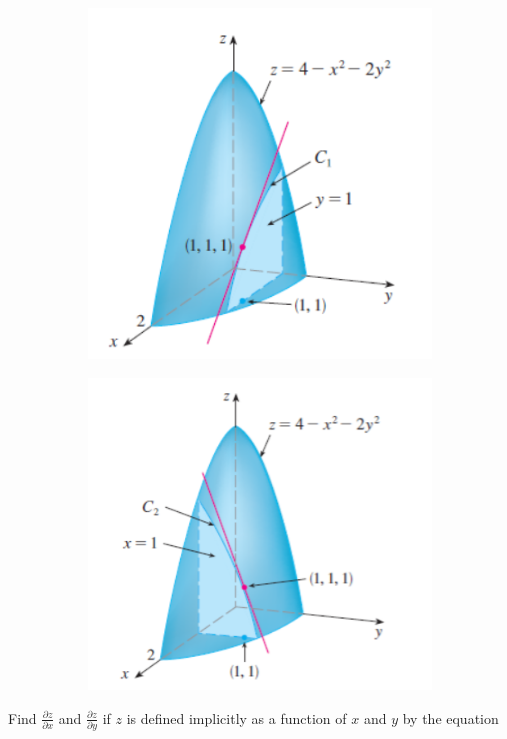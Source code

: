         \begin{figure}[hbt!]
            \centering
            \begin{subfigure}[b]{.45\textwidth}
                \includegraphics[scale = 0.75]{Resources/14.3_Paraboloid}
            \end{subfigure}
            \begin{subfigure}[b]{.45\textwidth}
                \includegraphics[scale = 0.75]{Resources/14.3_Paraboloid2}
            \end{subfigure}
        \end{figure}

        \textit{} Find $\frac{\partial z}{\partial x}$ and $\frac{\partial z}{\partial y}$ if $z$ is defined implicitly as a function of $x$ and $y$ by the equation

